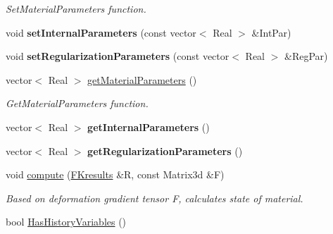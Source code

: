 \begin{DoxyCompactItemize}
\begin{DoxyCompactList}\small\item\em SetMaterialParameters function. \item\end{DoxyCompactList}\item 
\hypertarget{classvoom_1_1_pass_myo_a_a413a68f64bd4b31f7f31762b371ce168}{
void {\bfseries setInternalParameters} (const vector$<$ Real $>$ \&IntPar)}
\label{classvoom_1_1_pass_myo_a_a413a68f64bd4b31f7f31762b371ce168}

\item 
\hypertarget{classvoom_1_1_pass_myo_a_afd21cbc27fb5bdb9c13b476fb9d31e71}{
void {\bfseries setRegularizationParameters} (const vector$<$ Real $>$ \&RegPar)}
\label{classvoom_1_1_pass_myo_a_afd21cbc27fb5bdb9c13b476fb9d31e71}

\item 
\hypertarget{classvoom_1_1_pass_myo_a_a63cdaa267f12644f0bfb370e8edb437a}{
vector$<$ Real $>$ \hyperlink{classvoom_1_1_pass_myo_a_a63cdaa267f12644f0bfb370e8edb437a}{getMaterialParameters} ()}
\label{classvoom_1_1_pass_myo_a_a63cdaa267f12644f0bfb370e8edb437a}

\begin{DoxyCompactList}\small\item\em GetMaterialParameters function. \item\end{DoxyCompactList}\item 
\hypertarget{classvoom_1_1_pass_myo_a_a8c64a85541b9b3d7ddfbc2af457c6f7d}{
vector$<$ Real $>$ {\bfseries getInternalParameters} ()}
\label{classvoom_1_1_pass_myo_a_a8c64a85541b9b3d7ddfbc2af457c6f7d}

\item 
\hypertarget{classvoom_1_1_pass_myo_a_a21875f4e7fcc512d2a7d1e82d9528d02}{
vector$<$ Real $>$ {\bfseries getRegularizationParameters} ()}
\label{classvoom_1_1_pass_myo_a_a21875f4e7fcc512d2a7d1e82d9528d02}

\item 
\hypertarget{classvoom_1_1_pass_myo_a_ab35459b2c4fc26eccf86a039c28c1150}{
void \hyperlink{classvoom_1_1_pass_myo_a_ab35459b2c4fc26eccf86a039c28c1150}{compute} (\hyperlink{structvoom_1_1_mechanics_material_1_1_f_kresults}{FKresults} \&R, const Matrix3d \&F)}
\label{classvoom_1_1_pass_myo_a_ab35459b2c4fc26eccf86a039c28c1150}

\begin{DoxyCompactList}\small\item\em Based on deformation gradient tensor F, calculates state of material. \item\end{DoxyCompactList}\item 
\hypertarget{classvoom_1_1_pass_myo_a_a06cf31fdeb3e84c3aa7553928bcf3b01}{
bool \hyperlink{classvoom_1_1_pass_myo_a_a06cf31fdeb3e84c3aa7553928bcf3b01}{HasHistoryVariables} ()}
\label{classvoom_1_1_pass_myo_a_a06cf31fdeb3e84c3aa7553928bcf3b01}


\end{DoxyCompactItemize}
